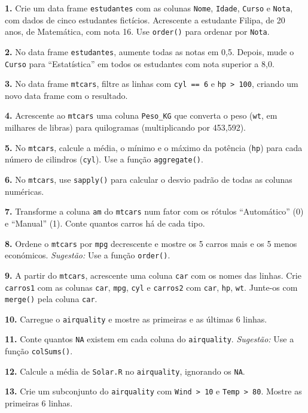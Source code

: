 \documentclass[
  portuguese,
  11pt,
  openany]{book}
\begin{document}
\textbf{1.} Crie um data frame \texttt{estudantes} com as colunas \texttt{Nome}, \texttt{Idade}, \texttt{Curso} e
\texttt{Nota}, com dados de cinco estudantes fictícios. Acrescente a estudante Filipa,
de 20 anos, de Matemática, com nota 16. Use \texttt{order()} para ordenar por \texttt{Nota}.

\textbf{2.} No data frame \texttt{estudantes}, aumente todas as notas em 0,5. Depois, mude o
\texttt{Curso} para ``Estatística'' em todos os estudantes com nota superior a 8,0.

\textbf{3.} No data frame \texttt{mtcars}, filtre as linhas com \texttt{cyl\ ==\ 6} e \texttt{hp\ \textgreater{}\ 100},
criando um novo data frame com o resultado.

\textbf{4.} Acrescente ao \texttt{mtcars} uma coluna \texttt{Peso\_KG} que converta o peso (\texttt{wt}, em
milhares de libras) para quilogramas (multiplicando por 453,592).

\textbf{5.} No \texttt{mtcars}, calcule a média, o mínimo e o máximo da potência (\texttt{hp}) para
cada número de cilindros (\texttt{cyl}). Use a função \texttt{aggregate()}.

\textbf{6.} No \texttt{mtcars}, use \texttt{sapply()} para calcular o desvio padrão de todas as
colunas numéricas.

\textbf{7.} Transforme a coluna \texttt{am} do \texttt{mtcars} num fator com os rótulos ``Automático''
(0) e ``Manual'' (1). Conte quantos carros há de cada tipo.

\textbf{8.} Ordene o \texttt{mtcars} por \texttt{mpg} decrescente e mostre os 5 carros mais e os 5
menos económicos.
\emph{Sugestão:} Use a função \texttt{order()}.

\textbf{9.} A partir do \texttt{mtcars}, acrescente uma coluna \texttt{car} com os nomes das linhas.
Crie \texttt{carros1} com as colunas \texttt{car}, \texttt{mpg}, \texttt{cyl} e \texttt{carros2} com \texttt{car}, \texttt{hp},
\texttt{wt}. Junte-os com \texttt{merge()} pela coluna \texttt{car}.

\textbf{10.} Carregue o \texttt{airquality} e mostre as primeiras e as últimas 6 linhas.

\textbf{11.} Conte quantos \texttt{NA} existem em cada coluna do \texttt{airquality}.
\emph{Sugestão:} Use a função \texttt{colSums()}.

\textbf{12.} Calcule a média de \texttt{Solar.R} no \texttt{airquality}, ignorando os \texttt{NA}.

\textbf{13.} Crie um subconjunto do \texttt{airquality} com \texttt{Wind\ \textgreater{}\ 10} e \texttt{Temp\ \textgreater{}\ 80}. Mostre
as primeiras 6 linhas.
\end{document}
